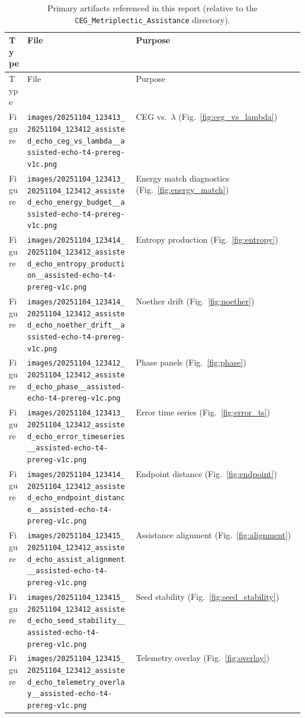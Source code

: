 \documentclass{article}
\begin{document}
\begin{longtable}{@{}llp{0.58\linewidth}@{}}
\caption{Primary artifacts referenced in this report (relative to the \texttt{CEG\_Metriplectic\_Assistance} directory).}
\label{tab:artifacts}\\
\toprule
Type & File & Purpose \\
\midrule
\endfirsthead
\toprule
Type & File & Purpose \\
\midrule
\endhead
Figure & \texttt{images/20251104\_123413\_20251104\_123412\_assisted\_echo\_ceg\_vs\_lambda\_\_assisted-echo-t4-prereg-v1c.png} & CEG vs.\ $\lambda$ (Fig.~\ref{fig:ceg_vs_lambda}) \\
Figure & \texttt{images/20251104\_123413\_20251104\_123412\_assisted\_echo\_energy\_budget\_\_assisted-echo-t4-prereg-v1c.png} & Energy match diagnostics (Fig.~\ref{fig:energy_match}) \\
Figure & \texttt{images/20251104\_123414\_20251104\_123412\_assisted\_echo\_entropy\_production\_\_assisted-echo-t4-prereg-v1c.png} & Entropy production (Fig.~\ref{fig:entropy}) \\
Figure & \texttt{images/20251104\_123414\_20251104\_123412\_assisted\_echo\_noether\_drift\_\_assisted-echo-t4-prereg-v1c.png} & Noether drift (Fig.~\ref{fig:noether}) \\
Figure & \texttt{images/20251104\_123412\_20251104\_123412\_assisted\_echo\_phase\_\_assisted-echo-t4-prereg-v1c.png} & Phase panels (Fig.~\ref{fig:phase}) \\
Figure & \texttt{images/20251104\_123413\_20251104\_123412\_assisted\_echo\_error\_timeseries\_\_assisted-echo-t4-prereg-v1c.png} & Error time series (Fig.~\ref{fig:error_ts}) \\
Figure & \texttt{images/20251104\_123414\_20251104\_123412\_assisted\_echo\_endpoint\_distance\_\_assisted-echo-t4-prereg-v1c.png} & Endpoint distance (Fig.~\ref{fig:endpoint}) \\
Figure & \texttt{images/20251104\_123415\_20251104\_123412\_assisted\_echo\_assist\_alignment\_\_assisted-echo-t4-prereg-v1c.png} & Assistance alignment (Fig.~\ref{fig:alignment}) \\
Figure & \texttt{images/20251104\_123415\_20251104\_123412\_assisted\_echo\_seed\_stability\_\_assisted-echo-t4-prereg-v1c.png} & Seed stability (Fig.~\ref{fig:seed_stability}) \\
Figure & \texttt{images/20251104\_123415\_20251104\_123412\_assisted\_echo\_telemetry\_overlay\_\_assisted-echo-t4-prereg-v1c.png} & Telemetry overlay (Fig.~\ref{fig:overlay}) \\

\end{longtable}
\end{document}
